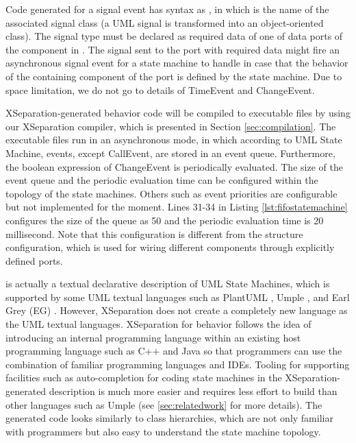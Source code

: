 Code generated for a signal event has syntax as , in which  is the name of the associated signal class (a UML signal is transformed into an object-oriented class).
The signal type must be declared as required data of one of data ports of the component in .
The signal sent to the port with required data might fire an asynchronous signal event for a state machine to handle in case that the behavior of the containing component of the port is defined by the state machine.
Due to space limitation, we do not go to details of TimeEvent and ChangeEvent.

XSeparation-generated behavior code will be compiled to executable files by using our XSeparation compiler, which is presented in Section \ref{sec:compilation}.
The executable files run in an asynchronous mode, in which according to UML State Machine, events, except CallEvent, are stored in an event queue.
Furthermore, the boolean expression of ChangeEvent is periodically evaluated.
The size of the event queue and the periodic evaluation time can be configured within the topology of the state machines.
Others such as event priorities are configurable but not implemented for the moment.
Lines 31-34 in Listing \ref{lst:fifostatemachine} configures the size of the queue as 50 and the periodic evaluation time is 20 millisecond.
Note that this configuration is different from the structure configuration, which is used for wiring different components through explicitly defined ports.

 is actually a textual declarative description of UML State Machines, which is supported by some UML textual languages such as PlantUML \cite{plantuml}, Umple \cite{lethbridge2010umplification}, and Earl Grey (EG) \cite{mazanec2012general}.
However, XSeparation does not create a completely new language as the UML textual languages. 
XSeparation for behavior follows the idea of introducing an internal programming language within an existing host programming language such as C++ and Java \cite{Hinkel2015} so that programmers can use the combination of familiar programming languages and IDEs.
Tooling for supporting facilities such as auto-completion for coding state machines in the XSeparation-generated description is much more easier and requires less effort to build than other languages such as Umple (see \ref{sec:relatedwork} for more details). 
The generated code looks similarly to class hierarchies, which are not only familiar with programmers but also easy to understand the state machine topology. 

